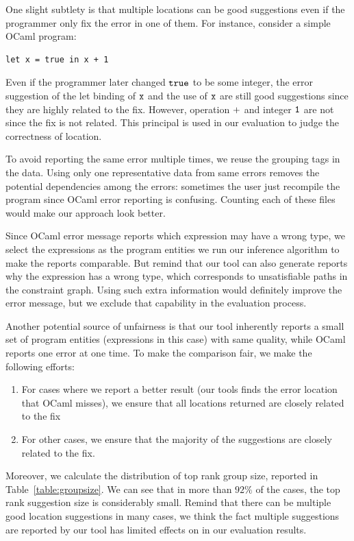 One slight subtlety is that multiple locations can be good suggestions
even if the programmer only fix the error in one of them. For
instance, consider a simple OCaml program:
\begin{lstlisting}
let x = true in x + 1
\end{lstlisting}

Even if the programmer later changed $\mathtt{true}$ to be some integer,
the error suggestion of the let binding of $\mathtt{x}$ and the use of
$\mathtt{x}$ are still good suggestions since they are highly related to
the fix. However, operation $\mathtt{+}$ and integer $\mathtt{1}$ are not
since the fix is not related. This principal is used in our evaluation
to judge the correctness of location.

To avoid reporting the same error multiple times, we reuse the
grouping tags in the data. Using only one representative data from
same errors removes the potential dependencies among the errors:
sometimes the user just recompile the program since OCaml error
reporting is confusing. Counting each of these files would make our
approach look better.

Since OCaml error message reports which expression may have a wrong
type, we select the expressions as the program entities we run our
inference algorithm to make the reports comparable. But remind that
our tool can also generate reports why the expression has a wrong
type, which corresponds to unsatisfiable paths in the constraint
graph. Using such extra information would definitely improve the error
message, but we exclude that capability in the evaluation process.

Another potential source of unfairness is that our tool inherently
reports a small set of program entities (expressions in this case)
with same quality, while OCaml reports one error at one time. To make
the comparison fair, we make the following efforts:
\begin{enumerate}
\item For cases where we report a better result (our tools finds the
error location that OCaml misses), we ensure that all locations
returned are closely related to the fix

\item For other cases, we ensure that the majority of the suggestions
are closely related to the fix. 
\end{enumerate}

Moreover, we calculate the distribution of top rank group size,
reported in Table~\ref{table:groupsize}. We can see that in more than
$92\%$ of the cases, the top rank suggestion size is considerably
small. Remind that there can be multiple good location suggestions in
many cases, we think the fact multiple suggestions are reported by our
tool has limited effects on in our evaluation results.

